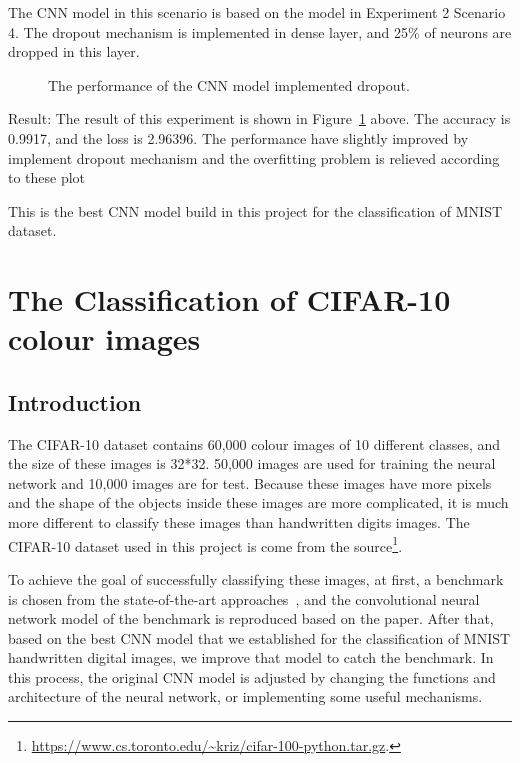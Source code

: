 \documentclass[]{UCD_CS_FYP_Report}
\begin{document}
The CNN model in this scenario is based on the model in Experiment 2 Scenario 4. The dropout mechanism is implemented in dense layer, and 25\% of neurons are dropped in this layer.  
\begin{figure}[h]
\centering
\fboxsep 2mm
\caption{\label{fig:MNIST_CNN_S5E1} The performance of the CNN model implemented dropout.}
\end{figure}
Result: The result of this experiment is shown in Figure~\ref{fig:MNIST_CNN_S5E1} above. The accuracy is 0.9917, and the loss is 2.96396. The performance have slightly improved by implement dropout mechanism and the overfitting problem is relieved according to these plot

This is the best CNN model build in this project for the classification of MNIST dataset.
\chapter{\label{chapter4}The Classification of CIFAR-10 colour images}
\section{Introduction}
The CIFAR-10 dataset contains 60,000 colour images of 10 different classes, and the size of these images is 32*32. 50,000 images are used for training the neural network and 10,000 images are for test. Because these images have more pixels and the shape of the objects inside these images are more complicated, it is much more different to classify these images than handwritten digits images. The CIFAR-10 dataset used in this project is come from the source\footnote{\url{https://www.cs.toronto.edu/~kriz/cifar-100-python.tar.gz}.}.

To achieve the goal of successfully classifying these images, at first, a benchmark is chosen from the state-of-the-art approaches~\cite{Lars:2015}, and the convolutional neural network model of the benchmark is reproduced based on the paper. After that, based on the best CNN model that we established for the classification of MNIST handwritten digital images, we improve that model to catch the benchmark. In this process, the original CNN model is adjusted by changing the functions and architecture of the neural network, or implementing some useful mechanisms. 
\end{document}

